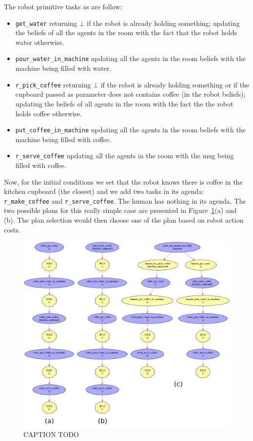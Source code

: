\documentclass[a4paper,11pt,twoside]{StyleThese}
\begin{document}
The robot primitive tasks as are follow:
\begin{itemize}
\item \verb'get_water' returning $\bot$ if the robot is already holding something; updating the beliefs of all the agents in the room with the fact that the robot holds water otherwise.
\item \verb'pour_water_in_machine' updating all the agents in the room beliefs with the machine being filled with water.
\item \verb'r_pick_coffee' returning $\bot$ if the robot is already holding something or if the cupboard passed as parameter does not contains coffee (in the robot beliefs); updating the beliefs of all agents in the room with the fact the the robot holds coffee otherwise.
\item \verb'put_coffee_in_machine' updating all the agents in the room beliefs with the machine being filled with coffee.
\item \verb'r_serve_coffee' updating all the agents in the room with the mug being filled with coffee.
\end{itemize}

Now, for the initial conditions we set that the robot knows there is coffee in the kitchen cupboard (the closest) and we add two tasks in its agenda: \verb'r_make_coffee' and \verb'r_serve_coffee'. The human has nothing in its agenda. The two possible plans for this really simple case are presented in Figure~\ref{fig:chap4coffeesimple}(a) and (b). The plan selection would then choose one of the plan based on robot action costs.

\begin{figure}[hbtp]
\centering
\includegraphics[width=\textwidth]{figures/chapter4/Chap4CoffeeSimplePlan.png}
\caption{CAPTION TODO}
\label{fig:chap4coffeesimple}
\end{figure}
\end{document}
